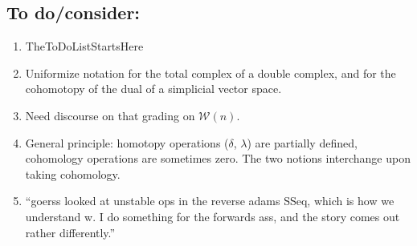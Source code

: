 \documentclass[11pt]{amsart} \renewcommand{\baselinestretch}{1.2}
\theoremstyle{plain}
\numberwithin{equation}{section} %
\theoremstyle{plain}
\numberwithin{equation}{chapter} %
\newcommand{\DASH}{\mathrm{-}}
\newcommand{\squishlist}{
  \setlength{\itemsep}{.5pt}
  \setlength{\parskip}{0pt}
  \setlength{\parsep}{0pt}}
\newcommand{\calU}{\mathcal{U}}
\newcommand{\calL}{\mathcal{L}}
\newcommand{\calw}{\mathcal{W}}
\newcommand{\calc}{\mathcal{C}}
\newcommand{\quadgrad}[1]{\mathrm{q}_{#1}}
\newcommand{\SectionOrChapter}[1]{\section{\textbf{#1}}}
\begin{document}
\begin{todolist}
\SectionOrChapter{To do/consider:}
\begin{enumerate}\squishlist
\setlength{\parindent}{.25in}
\item TheToDoListStartsHere
\item Uniformize notation for the total complex of a double complex, and for the cohomotopy of the dual of a simplicial vector space.
\item Need discourse on that grading on $\calw(n)$.
\item General principle: homotopy operations ($\delta$, {$\lambda$}) are partially defined, cohomology operations are sometimes zero. The two notions interchange upon taking cohomology.
\item ``goerss looked at unstable ops in the reverse adams SSeq, which is how we understand w. I do something for the forwards ass, and the story comes out rather differently.''

\end{enumerate}
\end{todolist}
\end{document}
